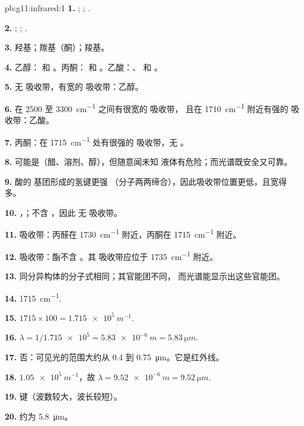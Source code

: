 \begin{solution}{pb:g11:infrared:1}
\textbf{1.} ; ; .

\textbf{2.} ; ; .

\textbf{3.} 羟基；羰基（酮）；羧基。

\textbf{4.} 乙醇： 和 。丙酮：
 和 。乙酸：、 和 。

\textbf{5.} 无  吸收带，有宽的  吸收带：乙醇。

\textbf{6.} 在 2500 至 \qty{3300}{cm^{-1}} 之间有很宽的  吸收带，
且在 \qty{1710}{cm^{-1}} 附近有强的  吸收带：乙酸。

\textbf{7.} 丙酮：在
\qty{1715}{cm^{-1}} 处有很强的  吸收带，无 。

\textbf{8.} 可能是（醋、溶剂、醇），但随意闻未知
液体有危险；而光谱既安全又可靠。

\textbf{9.} 酸的  基团形成的氢键更强
（分子两两缔合），因此吸收带位置更低，且宽得多。

\textbf{10.} ，；不含 ，因此
无  吸收带。

\textbf{11.}  吸收带：丙醛在 \qty{1730}{cm^{-1}}
附近，丙酮在 \qty{1715}{cm^{-1}} 附近。

\textbf{12.}  吸收带：酯不含 。其 
吸收带应位于 \qty{1735}{cm^{-1}} 附近。

\textbf{13.} 同分异构体的分子式相同；其官能团不同，
而光谱能显示出这些官能团。

\textbf{14.} \qty{1715}{cm^{-1}}.

\textbf{15.} $1715 \times 100 = \qty{1.715e5}{m^{-1}}$.

\textbf{16.} $\lambda = 1/\num{1.715e5} = \qty{5.83e-6}{m} =
\qty{5.83}{\micro m}$.

\textbf{17.} 否：可见光的范围大约从 0.4 到
\qty{0.75}{\micro m}。它是红外线。

\textbf{18.} $\num{1.05e5}\ \si{m^{-1}}$，故 $\lambda = \qty{9.52e-6}{m}
= \qty{9.52}{\micro m}$.

\textbf{19.}  键（波数较大，波长较短）。

\textbf{20.} 约为 \qty{5.8}{\micro m}。
\end{solution}
